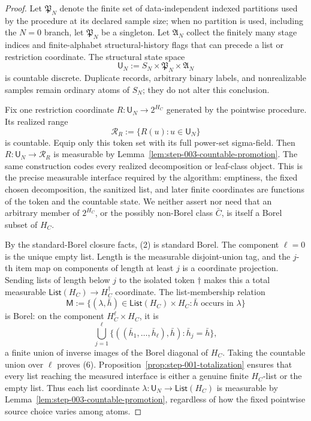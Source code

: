 \begin{proof}
Let \(\mathfrak P_N\) denote the finite set of data-independent
indexed partitions used by the procedure at its declared sample size; when
no partition is used, including the \(N=0\) branch, let
\(\mathfrak P_N\) be a singleton. Let \(\mathfrak A_N\) collect the finitely
many stage indices and finite-alphabet structural-history flags that can
precede a list or restriction coordinate. The structural state space
\[
\mathsf U_N:=S_N\times\mathfrak P_N\times\mathfrak A_N
\tag{4}
\]
is countable discrete. Duplicate records, arbitrary binary labels, and
nonrealizable samples remain ordinary atoms of \(S_N\); they do not alter
this conclusion.

Fix one restriction coordinate \(R:\mathsf U_N\to2^{H_C}\) generated by the
pointwise procedure. Its realized range
\[
\mathscr R_R:=\{R(u):u\in\mathsf U_N\}
\tag{5}
\]
is countable. Equip only this token set with its full power-set sigma-field.
Then \(R:\mathsf U_N\to\mathscr R_R\) is measurable by
Lemma~\ref{lem:step-003-countable-promotion}. The same construction codes
every realized decomposition or leaf-class object. This is the precise
measurable interface required by the algorithm: emptiness, the fixed chosen
decomposition, the sanitized list, and later finite coordinates are
functions of the token and the countable state. We neither assert nor need
that an arbitrary member of \(2^{H_C}\), or the possibly non-Borel class
\(\bar C\), is itself a Borel subset of \(H_C\).

By the standard-Borel closure facts, (2) is standard Borel. The component
\(\ell=0\) is the unique empty list. Length is the measurable disjoint-union
tag, and the \(j\)-th item map on components of length at least \(j\) is a
coordinate projection. Sending lists of length below \(j\) to the isolated
token \(\dagger\) makes this a total measurable
\(\mathsf{List}(H_C)\to H_C^\dagger\) coordinate. The list-membership
relation
\[
\mathsf M:=\{(\lambda,\bar h)\in
\mathsf{List}(H_C)\times H_C:\bar h\text{ occurs in }\lambda\}
\tag{6}
\]
is Borel: on the component \(H_C^\ell\times H_C\), it is
\[
\bigcup_{j=1}^{\ell}
\{((\bar h_1,\ldots,\bar h_\ell),\bar h):\bar h_j=\bar h\},
\tag{7}
\]
a finite union of inverse images of the Borel diagonal of \(H_C\). Taking
the countable union over \(\ell\) proves (6). Proposition~\ref{prop:step-001-totalization} ensures that every list reaching
the measured interface is either a genuine finite \(H_C\)-list or the empty
list. Thus each list coordinate
\(\lambda:\mathsf U_N\to\mathsf{List}(H_C)\) is measurable by
Lemma~\ref{lem:step-003-countable-promotion}, regardless of how the fixed
pointwise source choice varies among atoms.


\end{proof}
